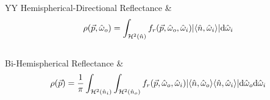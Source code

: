 {\begin{xltabular}{\linewidth}{YY}
		Hemispherical-Directional Reflectance &  \\
			{\begin{equation}\label{chapter3:surface:DHR}\rho(\vec{p},\hat{\omega}_o) = \int_{\mathcal{H}^2(\hat{n})}f_r(\vec{p},\hat{\omega}_o,\hat{\omega}_i)\vert\langle\hat{n},\hat{\omega}_{i}\rangle\vert\mathrm{d}\hat{\omega}_{i}\end{equation}}\\
		Bi-Hemispherical Reflectance &  \\
			{\begin{equation}\rho(\vec{p}) = \frac{1}{\pi}%
			\int_{\mathcal{H}^2(\hat{n}_i)}\int_{\mathcal{H}^2(\hat{n}_o)}f_r(\vec{p},\hat{\omega}_o,\hat{\omega}_i)\vert\dotpr{o}%
			\dotpr{i}\vert\mathrm{d}\hat{\omega}_o\mathrm{d}\hat{\omega}_i\end{equation}}\\
	\end{xltabular}
}
